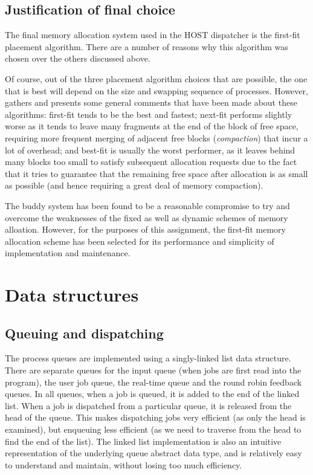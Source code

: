 \documentclass[12pt]{article}
\begin{document}
\subsection{Justification of final choice}
The final memory allocation system used in the HOST dispatcher is the first-fit
placement algorithm. There are a number of reasons why this algorithm was
chosen over the others discussed above.

Of course, out of the three placement algorithm choices that are possible, the
one that is best will depend on the size and swapping sequence of processes.
However, \cite{stallings:2012} gathers and presents some general comments that
have been made about these algorithms: first-fit tends to be the best and
fastest; next-fit performs slightly worse as it tends to leave many fragments
at the end of the block of free space, requiring more frequent merging of
adjacent free blocks (\textit{compaction}) that incur a lot of overhead; and
best-fit is usually the worst performer, as it leaves behind many blocks too
small to satisfy subsequent allocation requests due to the fact that it tries
to guarantee that the remaining free space after allocation is as small as
possible (and hence requiring a great deal of memory compaction).

The buddy system has been found to be a reasonable compromise to try and
overcome the weaknesses of the fixed as well as dynamic schemes of memory 
alloation. However, for the purposes of this assignment, the first-fit memory
allocation scheme has been selected for its performance and simplicity of
implementation and maintenance.

\section{Data structures}

\subsection{Queuing and dispatching}
The process queues are implemented using a singly-linked list data structure.
There are separate queues for the input queue (when jobs are first read into
the program), the user job queue, the real-time queue and the round robin
feedback queues. In all queues, when a job is queued, it is added to the end of
the linked list. When a job is dispatched from a particular queue, it is
released from the head of the queue. This makes dispatching jobs very efficient
(as only the head is examined), but enqueuing less efficient (as we need to
traverse from the head to find the end of the list). The linked list
implementation is also an intuitive representation of the underlying queue
abstract data type, and is relatively easy to understand and maintain, without
losing too much efficiency.
\end{document}
